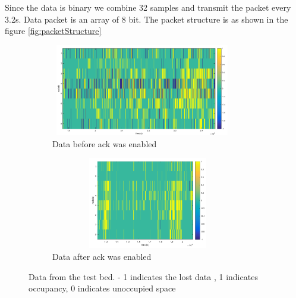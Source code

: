 Since the data is binary we combine 32 samples and transmit the packet every 3.2s. 
Data packet is an array of 8 bit. The packet structure is as shown in the figure \ref{fig:packetStructure}\\


\begin{figure}
    \centering
    \begin{subfigure}[b]{1\textwidth}
        \centering
        \includegraphics[width=8cm,height=4cm]{./pics/packetLoss.png}
      \caption{Data before ack was enabled}
    \end{subfigure}
    \hfill
    \begin{subfigure}[b]{1\textwidth}
        \centering
        \includegraphics[width=8.5cm,height=4cm]{./pics/dataAfterAck.png}
        \caption{Data after ack was enabled}
    \end{subfigure}
\caption{Data from the test bed. - 1 indicates the lost data , 1 indicates occupancy, 0 indicates unoccupied space}
\label{fig:packetLoss}
\end{figure}

